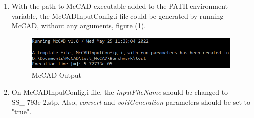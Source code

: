 \documentclass[letterpaper, 12 pt]{report}
\begin{document}
\begin{enumerate}
  \item With the path to McCAD executable added to the PATH environment variable, the McCADInputConfig.i file could be generated by running McCAD, without any arguments, figure (\ref{fig:McCAD_output}).
  \begin{figure}[h]
  	\centering
  	\includegraphics[scale=0.75]{figures/McCAD_output.png}
  	\caption{McCAD Output}
  	\label{fig:McCAD_output}
  \end{figure}

  \item On McCADInputConfig.i file, the \emph{inputFileName} should be changed to SS\_-793e-2.stp. Also, \emph{convert} and \emph{voidGeneration} parameters should be set to "true".
  

\end{enumerate}
\end{document}

